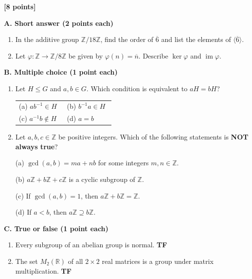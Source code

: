 \documentclass[11pt,letterpaper]{article}
\newcommand{\Z}{\mathbb Z}
\newcommand{\im}{\operatorname{im}}
\newcommand{\questionheading}[2]{\noindent{\large\bfseries #1}\hfill\textbf{[#2 points]}\par\medskip}
\begin{document}
\newpage
\questionheading{Short questions}{8}
\textbf{A. Short answer (2 points each)}
\begin{enumerate}[label=\textbf{A\arabic*.}]
\item In the additive group $\Z/18\Z$, find the order of $\overline{6}$ and list the elements of $\langle\overline{6}\rangle$.
\par\vspace*{1in}
\item Let $\varphi:\Z\to\Z/8\Z$ be given by $\varphi(n)=\overline{n}$. Describe $\ker\varphi$ and $\im\varphi$.
\par\vspace*{1in}
\end{enumerate}
\textbf{B. Multiple choice (1 point each)}
\begin{enumerate}[label=\textbf{B\arabic*.}]
\item Let $H\leq G$ and $a,b\in G$. Which condition is equivalent to $aH=bH$?

\begin{tabular}{@{}p{0.47\linewidth}p{0.47\linewidth}@{}}
(a) $ab^{-1}\in H$ & (b) $b^{-1}a\in H$ \\[5pt]
(c) $a^{-1}b\notin H$ & (d) $a=b$
\end{tabular}


\item Let $a,b,c\in\Z$ be positive integers. Which of the following statements is \textbf{NOT always true}?

(a) $\gcd(a,b)=ma+nb$ for some integers $m,n\in\Z$.

(b) $a\Z+b\Z+c\Z$ is a cyclic subgroup of $\Z$.

(c) If $\gcd(a,b)=1$, then $a\Z+b\Z=\Z$.

(d) If $a<b$, then $a\Z\supseteq b\Z$.



\end{enumerate}
\medskip
\textbf{C. True or false (1 point each)}
\begin{enumerate}[label=\textbf{C\arabic*.},itemsep=13pt]
\item Every subgroup of an abelian group is normal. \hfill \textbf{T\quad F}

\item The set $M_2(\mathbb R)$ of all $2\times2$ real matrices is a group under matrix multiplication. \hfill \textbf{T\quad F}
\end{enumerate}
\vfill
\newpage
\end{document}
